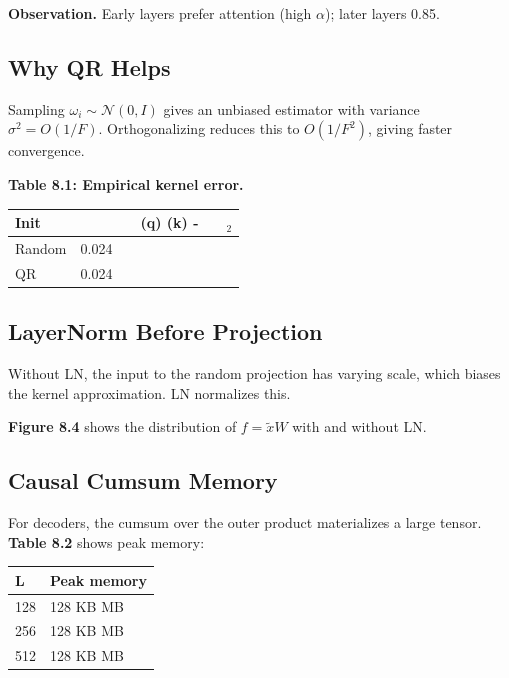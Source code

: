 \textbf{Observation.} Early layers prefer attention (high $\alpha$); later layers 
0.85.

\subsection{Why QR Helps}

Sampling $\omega_i \sim \mathcal{N}(0, I)$ gives an unbiased estimator 
with variance $\sigma^2 = O(1/F)$. Orthogonalizing reduces this to 
$O(1/F^2)$, giving faster convergence.

\textbf{Table 8.1: Empirical kernel error.}

\begin{table}[H]
\centering
\small
\begin{tabular}{llllll}
\toprule
\textbf{Init} & \textbf{} & \textbf{} & \textbf{(q)  (k) -} & \textbf{} & \textbf{$_2$} \\
\midrule
Random & 0.024 &  &  &  &  \\
QR & 0.024 &  &  &  &  \\
\bottomrule
\end{tabular}
\end{table}

\subsection{LayerNorm Before Projection}

Without LN, the input to the random projection has varying scale, which 
biases the kernel approximation. LN normalizes this.

\textbf{Figure 8.4} shows the distribution of $f = \tilde{x} W$ with and 
without LN.

\subsection{Causal Cumsum Memory}

For decoders, the cumsum over the outer product materializes a large 
tensor. \textbf{Table 8.2} shows peak memory:

\begin{table}[H]
\centering
\small
\begin{tabular}{ll}
\toprule
\textbf{L} & \textbf{Peak memory} \\
\midrule
128 & 128 KB MB \\
256 & 128 KB MB \\
512 & 128 KB MB \\
\bottomrule
\end{tabular}
\end{table}

